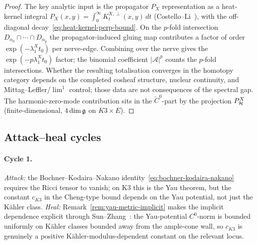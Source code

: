 \begin{proof}
The key analytic input is the propagator $P_X$ representation as a
heat-kernel integral
$P_X(x,y) = \int_0^\infty K_t^{X,\perp}(x, y) \, dt$
\textup{(Costello--Li~\cite{CostelloLi2012})}, with the off-diagonal
decay~\eqref{eq:heat-kernel-perp-bound}. On the $p$-fold intersection
$D_{\alpha_0} \cap \cdots \cap D_{\alpha_p}$ the propagator-induced
gluing map contributes a factor of order $\exp(-\lambda_1^X t_0)$ per
nerve-edge. Combining over the nerve gives the
$\exp(-p \lambda_1^X t_0)$ factor; the binomial coefficient
$|\mathcal{A}|^p$ counts the $p$-fold intersections. Whether the
resulting totalisation converges in the homotopy category depends on
the completed cosheaf structure, nuclear continuity, and
Mittag--Leffler/$\lim^1$ control; those data are not consequences of
the spectral gap. The harmonic-zero-mode contribution sits in the
$\check C^0$-part by the projection $P_{\mathcal{H}}^X$
\textup{(}finite-dimensional, $4\dim\mathfrak{g}$ on $K3 \times E$\textup{).}
\end{proof}

\subsection{Attack--heal cycles}
\label{subsec:attack-heal}

\paragraph{Cycle 1.} \emph{Attack:} the Bochner--Kodaira--Nakano
identity~\eqref{eq:bochner-kodaira-nakano} requires the Ricci tensor to
vanish; on K3 this is the Yau theorem, but the constant $c_{K3}$ in
the Cheng-type bound depends on the Yau potential, not just the
K\"ahler class.
\emph{Heal:} Remark~\ref{rem:yau-metric-implicit} makes the implicit
dependence explicit through Sun--Zhang~\cite{SunZhang2014}: the
Yau-potential $C^0$-norm is bounded uniformly on K\"ahler classes
bounded away from the ample-cone wall, so $c_{K3}$ is genuinely a
positive K\"ahler-modulus-dependent constant on the relevant locus.


